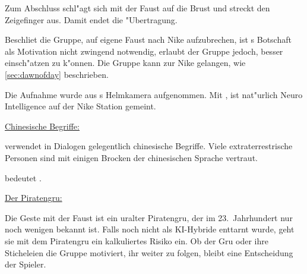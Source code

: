 
Zum Abschluss schl"agt \xl{} sich mit der Faust auf die Brust und streckt den Zeigefinger aus. Damit endet die "Ubertragung.

Beschlie\3t die Gruppe, auf eigene Faust nach Nike aufzubrechen, ist \xl{}s Botschaft als Motivation nicht zwingend notwendig, erlaubt der Gruppe jedoch, \xl{} besser einsch"atzen zu k"onnen. Die Gruppe kann zur Nike gelangen, wie \cref{sec:dawnofday} beschrieben.
\vfill

\begin{remarks}
	Die Aufnahme wurde aus \ml{}s Helmkamera aufgenommen. Mit , ist nat"urlich Neuro Intelligence auf der Nike Station gemeint.

	\underline{Chinesische Begriffe:}

	\xl{} verwendet in Dialogen gelegentlich chinesische Begriffe. Viele extraterrestrische Personen sind mit einigen Brocken der chinesischen Sprache vertraut.
	
	 bedeutet .

	\underline{Der Piratengru\3:}

	Die Geste mit der Faust ist ein uralter Piratengru\3, der im 23.~Jahrhundert nur noch wenigen bekannt ist. Falls \xl{} noch nicht als KI-Hybride enttarnt wurde, geht sie mit dem Piratengru\3 ein kalkuliertes Risiko ein. Ob der Gru\3 oder ihre Sticheleien die Gruppe motiviert, ihr weiter zu folgen, bleibt eine Entscheidung der Spieler.
\end{remarks}	

